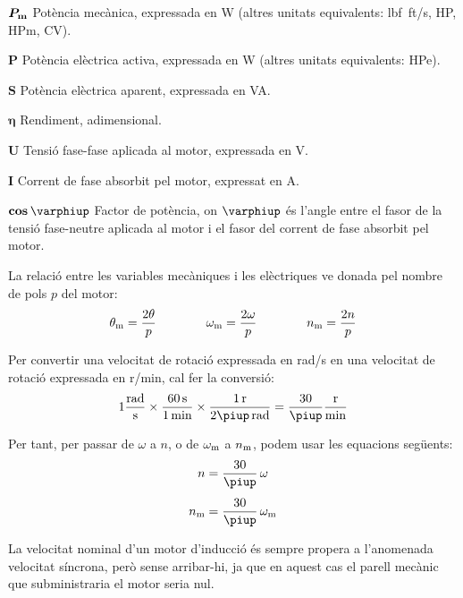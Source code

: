 \begin{list}{}
   \item[$\boldsymbol{P_\mathrm{m}}$] Potència mecànica, expressada en \si{W} (altres unitats equivalents: \si{lbf.ft/s}, \si{HP},  \si{HPm}, \si{CV}).
   \item[$\boldsymbol{P}$] Potència elèctrica activa, expressada en \si{W} (altres unitats equivalents: \si{HPe}).
   \item[$\boldsymbol{S}$] Potència elèctrica aparent, expressada en \si{VA}.
   \item[$\boldsymbol{\eta}$] Rendiment, adimensional.
   \item[$\boldsymbol{U}$] Tensió fase-fase aplicada al motor, expressada en \si{V}.
   \item[$\boldsymbol{I}$] Corrent de fase absorbit pel motor, expressat en \si{A}.
   \item[$\boldsymbol{\cos\varphiup}$] Factor de potència, on $\varphiup$ és l'angle entre el fasor de la tensió fase-neutre aplicada al motor i el fasor del corrent de fase absorbit pel motor.
\end{list}

La relació entre les variables mecàniques i les elèctriques ve donada pel nombre de pols $p$ del motor:
\begin{equation}\label{eq:vel-ele-mec}
    \theta_\mathrm{m} = \frac{2\theta}{p} \qquad\qquad
    \omega_\mathrm{m} = \frac{2\omega}{p} \qquad\qquad
    n_\mathrm{m} = \frac{2n}{p}
\end{equation}

Per  convertir una velocitat de rotació expressada en \si{rad/s} en una velocitat de rotació expressada en \si{r/min}, cal fer la conversió:
\begin{equation}
 1\frac{\si{rad}}{\si{s}} \times \frac{\SI{60}{s}}{\SI{1}{min}} \times \frac{\SI{1}{r}}{2\piup\,\si{rad}} = \frac{30}{\piup}\frac{\si{r}}{\si{min}}
 \end{equation}

 Per tant, per passar de $\omega$ a $n$, o de $\omega_\mathrm{m}$ a $n_\mathrm{m}$, podem usar les equacions següents:
\begin{subequations}\index{motors d'inducció!velocitat}
\begin{align}
    n        &= \frac{30}{\piup} \,\omega \\[1ex]
    n\ped{m} &= \frac{30}{\piup} \,\omega\ped{m}
\end{align}
\end{subequations}

La velocitat nominal d'un motor d'inducció és sempre propera a l'anomenada velocitat síncrona, però sense arribar-hi, ja que en aquest cas el parell mecànic que subministraria el motor seria nul.

